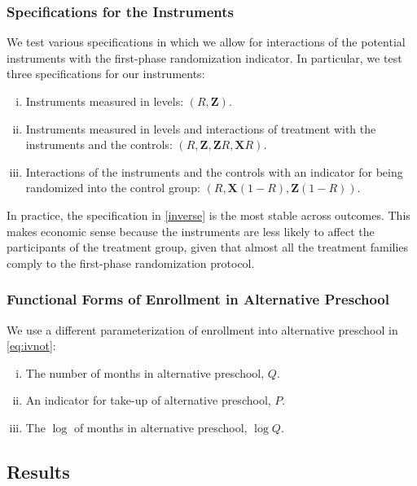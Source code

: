 \subsubsection{Specifications for the Instruments}
\noindent We test various specifications in which we allow for interactions of the potential instruments with the first-phase randomization indicator. In particular, we test three specifications for our instruments:

\begin{enumerate}[(i)]
\item Instruments measured in levels: $ \left( R,\mathbf{Z} \right) $.
\item\label{interact} Instruments measured in levels and interactions of treatment with the instruments and the controls: $ \left(R,\mathbf{Z},\mathbf{Z}R,\mathbf{X}R \right)$.
\item\label{inverse} Interactions of the instruments and the controls with an indicator for being randomized into the control group: $\left( R, \mathbf{X} \left( 1-R \right), \mathbf{Z} \left( 1-R \right) \right)$.
\end{enumerate}

\noindent In practice, the specification in \eqref{inverse} is the most stable across outcomes. This makes economic sense because the instruments are less likely to affect the participants of the treatment group, given that almost all the treatment families comply to the first-phase randomization protocol.

\subsubsection{Functional Forms of Enrollment in Alternative Preschool}

\noindent We use a different parameterization of enrollment into alternative preschool in \eqref{eq:ivnot}:

\begin{enumerate}[(i)]
\item The number of months in alternative preschool, $Q$.
\item An indicator for take-up of alternative preschool, $P$.
\item The $\log$ of months in alternative preschool, $\log Q$.
\end{enumerate}

\subsection{Results}


